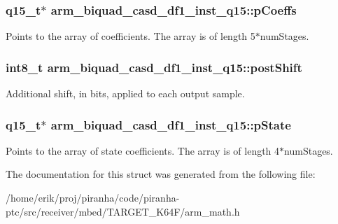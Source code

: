 \subsubsection[{\texorpdfstring{p\+Coeffs}{pCoeffs}}]{\setlength{\rightskip}{0pt plus 5cm}q15\+\_\+t$\ast$ arm\+\_\+biquad\+\_\+casd\+\_\+df1\+\_\+inst\+\_\+q15\+::p\+Coeffs}\hypertarget{structarm__biquad__casd__df1__inst__q15_a1edaacdebb5b09d7635bf20c779855fc}{}\label{structarm__biquad__casd__df1__inst__q15_a1edaacdebb5b09d7635bf20c779855fc}
Points to the array of coefficients. The array is of length 5$\ast$num\+Stages. 
\subsubsection[{\texorpdfstring{post\+Shift}{postShift}}]{\setlength{\rightskip}{0pt plus 5cm}int8\+\_\+t arm\+\_\+biquad\+\_\+casd\+\_\+df1\+\_\+inst\+\_\+q15\+::post\+Shift}\hypertarget{structarm__biquad__casd__df1__inst__q15_ada7e9d6269e6ed4eacf8f68729e9832d}{}\label{structarm__biquad__casd__df1__inst__q15_ada7e9d6269e6ed4eacf8f68729e9832d}
Additional shift, in bits, applied to each output sample. 
\subsubsection[{\texorpdfstring{p\+State}{pState}}]{\setlength{\rightskip}{0pt plus 5cm}q15\+\_\+t$\ast$ arm\+\_\+biquad\+\_\+casd\+\_\+df1\+\_\+inst\+\_\+q15\+::p\+State}\hypertarget{structarm__biquad__casd__df1__inst__q15_a5481104ef2f8f81360b80b47d69ae932}{}\label{structarm__biquad__casd__df1__inst__q15_a5481104ef2f8f81360b80b47d69ae932}
Points to the array of state coefficients. The array is of length 4$\ast$num\+Stages. 

The documentation for this struct was generated from the following file\+:\begin{DoxyCompactItemize}
\item 
/home/erik/proj/piranha/code/piranha-\/ptc/src/receiver/mbed/\+T\+A\+R\+G\+E\+T\+\_\+\+K64\+F/arm\+\_\+math.\+h\end{DoxyCompactItemize}

